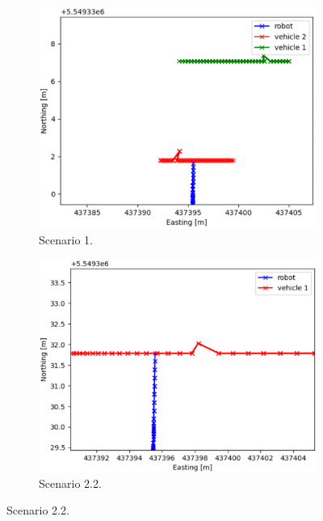         \begin{figure}[H]
            \centering
            \begin{subfigure}{0.32\linewidth}
                \centering
                \includegraphics[width=\linewidth]{images/simulations/closest_1.png}
                \caption{Scenario 1.}
            \end{subfigure}
            \begin{subfigure}{0.32\linewidth}
                \centering
                \includegraphics[width=\linewidth]{images/simulations/closest_2_2.png}
                \caption{Scenario 2.2.}
            \end{subfigure}

\end{figure}
